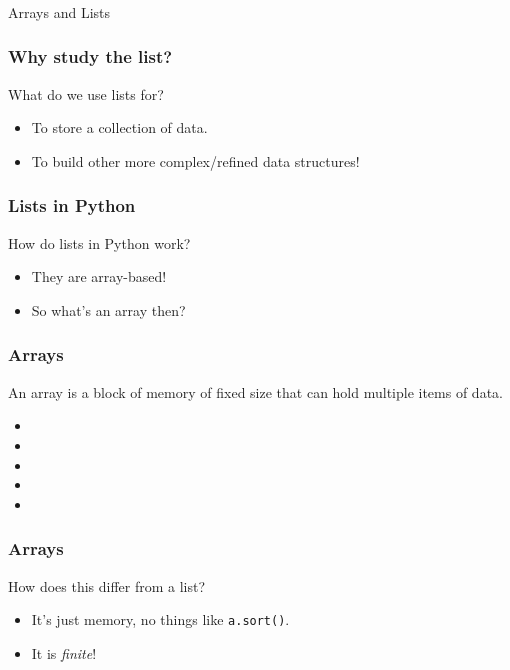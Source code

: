 \begin{frame}[fragile]\frametitle{}
\begin{center}
{\Large Arrays and Lists}
\end{center}

\end{frame}

\begin{frame}
	\frametitle{Why study the list?}
		What do we use lists for?	

		\begin{itemize}
			\item To store a collection of data.
			\item To build other more complex/refined data structures!
		\end{itemize}
\end{frame}

\begin{frame}
	\frametitle{Lists in Python}
		How do lists in Python work?

		\begin{itemize}
			\item 		They are array-based!
			\item   	So what's an array then?
	\end{itemize}
\end{frame}

\begin{frame}
	\frametitle{Arrays}
		An array is a block of memory of fixed size that can hold multiple items of data.


	

			\begin{itemize}
			\item 	
			\item
			\item 	
			\item
			\item 	
	\end{itemize}


\end{frame}

\begin{frame}
	\frametitle{Arrays}

	
			How does this differ from a list?

			\begin{itemize}
				\item It's just memory, no things like \texttt{a.sort()}.
				\item It is \textit{finite}!
			\end{itemize}

\end{frame}

